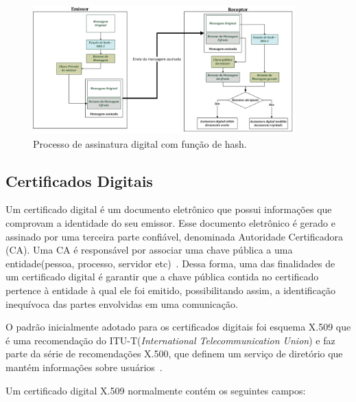 \begin{figure}[!htb]
\centering
\includegraphics[width=0.9\textwidth]{esquema_assinatura_digital.png}
\caption{Processo de assinatura digital com função de hash.}
\label{fig:esquemaassinaturadigital}
\end{figure}

\subsection{Certificados Digitais}

Um certificado digital é um documento eletrônico que possui informações que comprovam a identidade do seu emissor. Esse documento eletrônico é gerado e assinado por uma terceira parte confiável, denominada Autoridade Certificadora (CA). Uma CA é responsável por associar uma chave pública a uma entidade(pessoa, processo, servidor etc)~\cite{forouzan2013redes}. Dessa forma, uma das finalidades de um certificado digital é garantir que a chave pública contida no certificado pertence à entidade à qual ele foi emitido, possibilitando assim, a identificação inequívoca das partes envolvidas em uma comunicação.

O padrão inicialmente adotado para os certificados digitais foi esquema X.509 que é uma recomendação do ITU-T(\emph{International Telecommunication Union}) e faz parte da série de recomendações X.500, que definem um serviço de diretório que mantém informações sobre usuários~\cite{stallings2008}.

Um certificado digital X.509 normalmente contém os seguintes campos:

